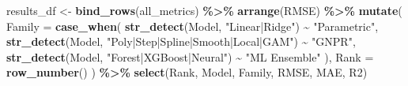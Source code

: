 \documentclass[
]{article}
\newenvironment{Shaded}{\begin{snugshade}}{\end{snugshade}}
\newcommand{\AttributeTok}[1]{\textcolor[rgb]{0.13,0.29,0.53}{#1}}
\newcommand{\FunctionTok}[1]{\textcolor[rgb]{0.13,0.29,0.53}{\textbf{#1}}}
\newcommand{\NormalTok}[1]{#1}
\newcommand{\OtherTok}[1]{\textcolor[rgb]{0.56,0.35,0.01}{#1}}
\newcommand{\SpecialCharTok}[1]{\textcolor[rgb]{0.81,0.36,0.00}{\textbf{#1}}}
\newcommand{\StringTok}[1]{\textcolor[rgb]{0.31,0.60,0.02}{#1}}
\begin{document}
\begin{Shaded}
\begin{Highlighting}[]
\NormalTok{results\_df }\OtherTok{\textless{}{-}} \FunctionTok{bind\_rows}\NormalTok{(all\_metrics) }\SpecialCharTok{\%\textgreater{}\%}
  \FunctionTok{arrange}\NormalTok{(RMSE) }\SpecialCharTok{\%\textgreater{}\%}
  \FunctionTok{mutate}\NormalTok{(}
    \AttributeTok{Family =} \FunctionTok{case\_when}\NormalTok{(}
      \FunctionTok{str\_detect}\NormalTok{(Model, }\StringTok{"Linear|Ridge"}\NormalTok{)        }\SpecialCharTok{\textasciitilde{}} \StringTok{"Parametric"}\NormalTok{,}
      \FunctionTok{str\_detect}\NormalTok{(Model, }\StringTok{"Poly|Step|Spline|Smooth|Local|GAM"}\NormalTok{) }\SpecialCharTok{\textasciitilde{}} \StringTok{"GNPR"}\NormalTok{,}
      \FunctionTok{str\_detect}\NormalTok{(Model, }\StringTok{"Forest|XGBoost|Neural"}\NormalTok{) }\SpecialCharTok{\textasciitilde{}} \StringTok{"ML Ensemble"}
\NormalTok{    ),}
    \AttributeTok{Rank   =} \FunctionTok{row\_number}\NormalTok{()}
\NormalTok{  ) }\SpecialCharTok{\%\textgreater{}\%}
  \FunctionTok{select}\NormalTok{(Rank, Model, Family, RMSE, MAE, R2)}


\end{Highlighting}
\end{Shaded}
\end{document}
